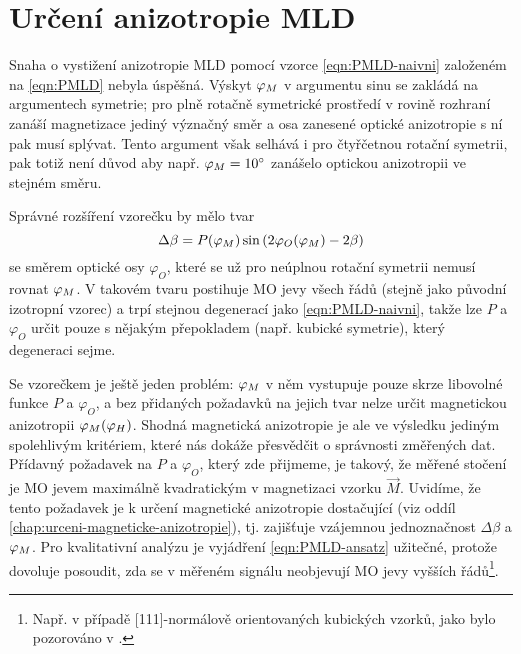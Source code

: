 \section{Určení anizotropie MLD}
\label{chap:anizotropie-MLD}

Snaha o vystižení anizotropie MLD pomocí vzorce \eqref{eqn:PMLD-naivni} založeném na \eqref{eqn:PMLD} nebyla úspěšná.
Výskyt $\varphi_M$ v argumentu sinu se zakládá na argumentech symetrie; pro plně rotačně symetrické prostředí v rovině rozhraní zanáší magnetizace jediný význačný směr a osa zanesené optické anizotropie s ní pak musí splývat.
Tento argument však selhává i pro čtyřčetnou rotační symetrii, pak totiž není důvod aby např. $\varphi_M=\SI{10}{\degree}$ zanášelo optickou anizotropii ve stejném směru.

Správné rozšíření vzorečku by mělo tvar
\begin{equation}
\label{eqn:PMLD-ansatz}
    \Delta\beta = P(\varphi_M) \sin \left( 2\varphi_O(\varphi_M) - 2\beta   \right)
\end{equation}
se směrem optické osy $\varphi_O$, které se už pro neúplnou rotační symetrii nemusí rovnat $\varphi_M$.
V takovém tvaru postihuje MO jevy všech řádů (stejně jako původní izotropní vzorec) a trpí stejnou degenerací jako \eqref{eqn:PMLD-naivni}, takže lze $P$ a $\varphi_O$ určit pouze s nějakým přepokladem (např. kubické symetrie), který degeneraci sejme.

Se vzorečkem je ještě jeden problém: $\varphi_M$ v něm vystupuje pouze skrze libovolné funkce $P$ a $\varphi_O$, a bez přidaných požadavků na jejich tvar nelze určit magnetickou anizotropii $\varphi_M(\varphi_H)$.
Shodná magnetická anizotropie je ale ve výsledku jediným spolehlivým kritériem, které nás dokáže přesvědčit o správnosti změřených dat.
Přídavný požadavek na $P$ a $\varphi_O$, který zde přijmeme, je takový, že měřené stočení je MO jevem maximálně kvadratickým v magnetizaci vzorku $\vec{M}$.
Uvidíme, že tento požadavek je k určení magnetické anizotropie dostačující (viz oddíl \ref{chap:urceni-magneticke-anizotropie}), tj. zajišťuje vzájemnou jednoznačnost $\Delta\beta$ a $\varphi_M$.
Pro kvalitativní analýzu je vyjádření \eqref{eqn:PMLD-ansatz} užitečné, protože dovoluje posoudit, zda se v měřeném signálu neobjevují MO jevy vyšších řádů\footnote{Např. v případě [111]-normálově orientovaných kubických vzorků, jako bylo pozorováno v \cite{silberQuadraticMagnetoopticKerr2019a}.}.

